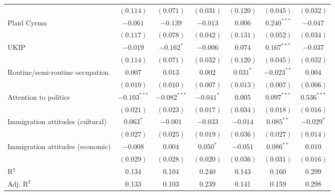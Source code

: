 \documentclass[12pt, letter]{article}
\begin{document}
\begin{table}
\begin{center}
{\begin{tabular}{l c c c c c c}
                                 & $(0.114)$      & $(0.071)$      & $(0.031)$      & $(0.120)$      & $(0.045)$      & $(0.032)$      \\
Plaid Cyrmu                      & $-0.061$       & $-0.139$       & $-0.013$       & $0.006$        & $0.240^{***}$  & $-0.047$       \\
                                 & $(0.117)$      & $(0.078)$      & $(0.042)$      & $(0.131)$      & $(0.052)$      & $(0.034)$      \\
UKIP                             & $-0.019$       & $-0.162^{*}$   & $-0.006$       & $0.074$        & $0.167^{***}$  & $-0.037$       \\
                                 & $(0.114)$      & $(0.071)$      & $(0.032)$      & $(0.120)$      & $(0.045)$      & $(0.032)$      \\
Routine/semi-routine occupation  & $0.007$        & $0.013$        & $0.002$        & $0.031^{*}$    & $-0.023^{**}$  & $0.004$        \\
                                 & $(0.010)$      & $(0.010)$      & $(0.007)$      & $(0.013)$      & $(0.007)$      & $(0.006)$      \\
Attention to politics            & $-0.103^{***}$ & $-0.082^{***}$ & $-0.041^{*}$   & $0.005$        & $0.097^{***}$  & $0.536^{***}$  \\
                                 & $(0.021)$      & $(0.023)$      & $(0.017)$      & $(0.034)$      & $(0.018)$      & $(0.016)$      \\
Immigration attitudes (cultural) & $0.063^{*}$    & $-0.001$       & $-0.033$       & $-0.014$       & $0.085^{**}$   & $-0.029^{*}$   \\
                                 & $(0.027)$      & $(0.025)$      & $(0.019)$      & $(0.036)$      & $(0.027)$      & $(0.014)$      \\
Immigration attitudes (economic) & $-0.008$       & $0.004$        & $0.050^{*}$    & $-0.051$       & $0.086^{**}$   & $0.010$        \\
                                 & $(0.029)$      & $(0.028)$      & $(0.020)$      & $(0.036)$      & $(0.031)$      & $(0.016)$      \\
\hline
R$^2$                            & 0.134          & 0.104          & 0.240          & 0.143          & 0.160          & 0.299          \\
Adj. R$^2$                       & 0.133          & 0.103          & 0.239          & 0.141          & 0.159          & 0.298          \\

\end{tabular}}
\end{center}
\end{table}
\end{document}
